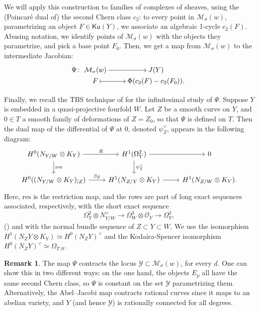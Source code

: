 \documentclass[11pt]{amsart}
\theoremstyle{definition}
\newtheorem{remark}[thm]{Remark}
\newcommand{\sO}{\mathcal{O}}
\newcommand{\sY}{\mathcal{Y}}
\newcommand{\sM}{\mathcal{M}}
\newcommand{\Ku}{\mathsf{Ku}}
\begin{document}
We will apply this construction to families of complexes of sheaves, using the (Poincar\'e dual of) the second Chern class $c_2$: to every point in $\sM_\sigma(w)$, parametrizing an object $F\in \Ku(Y)$, we associate an algebraic 1-cycle $c_2(F)$. Abusing notation, we identify points of $\sM_\sigma(w)$ with the objects they parametrize, and pick a base point $F_0$. Then, we get a map from $\sM_\sigma(w)$ to the intermediate Jacobian:
\[
\Psi \colon \xymatrix@R-2pc{\mathcal{M}_\sigma(w) \ar[r] & J(Y) \\ F \ar@{|->}[r] & \Phi(c_2(F)-c_2(F_0)).}
\]

Finally, we recall the TBS technique of \cite[Section~2]{Wel81} for the infinitesimal study of $\Psi$. Suppose $Y$ is embedded in a quasi-projective fourfold $W$. Let $Z$ be a smooth curve on $Y$, and $0\in T$ a smooth family of deformations of $Z=Z_0$, so that $\Psi$ is defined on $T$. Then the dual map of the differential of $\Psi$ at $0$, denoted $\psi_Z^\vee$, appears in the following diagram:
\begin{equation}\label{eq_diagram_AJ_codiff}
\begin{tikzcd}[]
H^0(N_{Y/W}\otimes K_Y) \rar["R"] \ar["\mathrm{res}"]{d} & H^1(\Omega^2_Y) \rar \ar["\psi_Z^\vee"]{d} & 0\\
H^0((N_{Y/W}\otimes K_Y)_{|Z}) \ar["\beta_Z"]{r} & H^1(N_{Z/Y} \otimes K_Y) \rar & H^1(N_{Z/W} \otimes K_Y).
\end{tikzcd}
\end{equation}
Here, $\mathrm{res}$ is the restriction map, and the rows are part of long exact sequences associated, respectively, with the short exact sequence
\[ \Omega_Y^2 \otimes N_{Y/W}^\vee \to \Omega_W^3 \otimes \sO_Y \to \Omega_Y^3, \]
(\cite[2.6]{Wel81}) and with the normal bundle sequence of $Z\subset Y \subset W$. We use the isomorphism $H^1(N_Z Y \otimes K_Y)\simeq H^0(N_Z Y)^\vee$ and the Kodaira-Spencer isomorphism $H^0(N_Z Y)^\vee \simeq \Omega_{T,0}$. 


\begin{remark}
\label{rmk_YContractedByAJ}
The map $\Psi$ contracts the locus $\sY\subset \sM_\sigma(w)$, for every $d$. One can show this in two different ways: on the one hand, the objects $E_p$ all have the same second Chern class, so $\Psi$ is constant on the set $\sY$ parametrizing them. Alternatively, the Abel--Jacobi map contracts rational curves since it maps to an abelian variety, and $Y$ (and hence $\sY$) is rationally connected for all degrees.
\end{remark}
\end{document}
